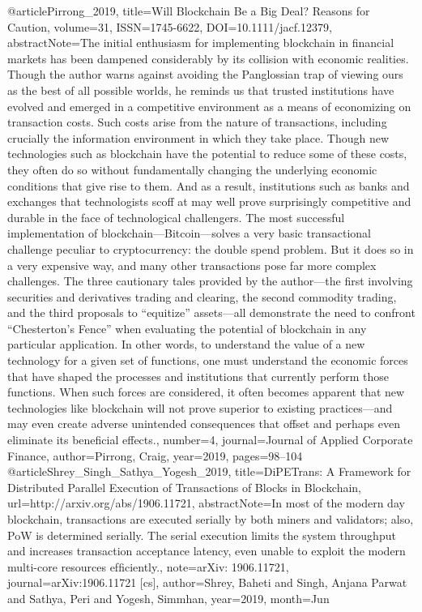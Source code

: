 {{ @article{Pirrong_2019, title={Will Blockchain Be a Big Deal? Reasons for Caution}, volume={31}, ISSN={1745-6622}, DOI={10.1111/jacf.12379}, abstractNote={The initial enthusiasm for implementing blockchain in financial markets has been dampened considerably by its collision with economic realities. Though the author warns against avoiding the Panglossian trap of viewing ours as the best of all possible worlds, he reminds us that trusted institutions have evolved and emerged in a competitive environment as a means of economizing on transaction costs. Such costs arise from the nature of transactions, including crucially the information environment in which they take place. Though new technologies such as blockchain have the potential to reduce some of these costs, they often do so without fundamentally changing the underlying economic conditions that give rise to them. And as a result, institutions such as banks and exchanges that technologists scoff at may well prove surprisingly competitive and durable in the face of technological challengers. The most successful implementation of blockchain—Bitcoin—solves a very basic transactional challenge peculiar to cryptocurrency: the double spend problem. But it does so in a very expensive way, and many other transactions pose far more complex challenges. The three cautionary tales provided by the author—the first involving securities and derivatives trading and clearing, the second commodity trading, and the third proposals to “equitize” assets—all demonstrate the need to confront “Chesterton’s Fence” when evaluating the potential of blockchain in any particular application. In other words, to understand the value of a new technology for a given set of functions, one must understand the economic forces that have shaped the processes and institutions that currently perform those functions. When such forces are considered, it often becomes apparent that new technologies like blockchain will not prove superior to existing practices—and may even create adverse unintended consequences that offset and perhaps even eliminate its beneficial effects.}, number={4}, journal={Journal of Applied Corporate Finance}, author={Pirrong, Craig}, year={2019}, pages={98–104} }
 @article{Shrey_Singh_Sathya_Yogesh_2019, title={DiPETrans: A Framework for Distributed Parallel Execution of Transactions of Blocks in Blockchain}, url={http://arxiv.org/abs/1906.11721}, abstractNote={In most of the modern day blockchain, transactions are executed serially by both miners and validators; also, PoW is determined serially. The serial execution limits the system throughput and increases transaction acceptance latency, even unable to exploit the modern multi-core resources efﬁciently.}, note={arXiv: 1906.11721}, journal={arXiv:1906.11721 [cs]}, author={Shrey, Baheti and Singh, Anjana Parwat and Sathya, Peri and Yogesh, Simmhan}, year={2019}, month={Jun} }
}}
